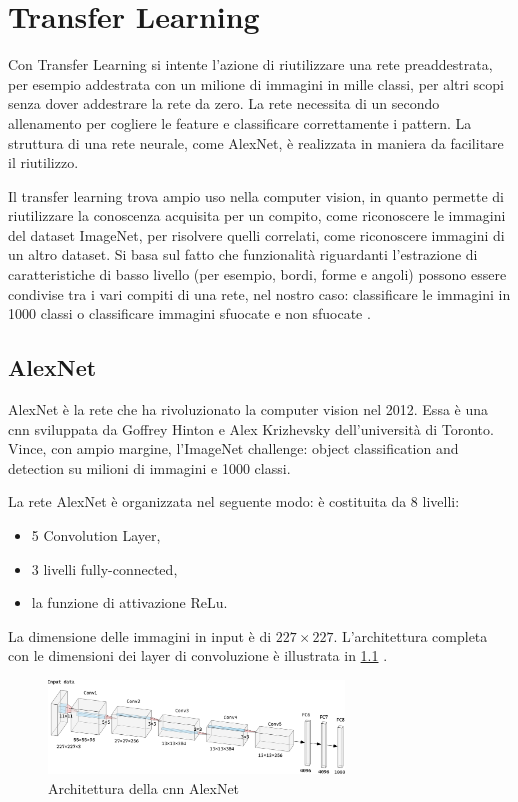 \chapter{Transfer Learning}\label{transfer-learning}

Con Transfer Learning si intente l'azione di riutilizzare una rete preaddestrata, per esempio addestrata con un milione di immagini in mille classi, per altri scopi senza dover addestrare la rete da zero. La rete necessita di un secondo allenamento per cogliere le feature e classificare correttamente i pattern. La struttura di una rete neurale, come AlexNet, è realizzata in maniera da facilitare il riutilizzo. 

Il transfer learning trova ampio uso nella computer vision, in quanto permette di riutilizzare la conoscenza acquisita per un
compito, come riconoscere le immagini del dataset ImageNet, per risolvere quelli correlati, come riconoscere immagini di un altro dataset. Si basa sul fatto che
funzionalità riguardanti l'estrazione di caratteristiche di basso livello
(per esempio, bordi, forme e angoli) possono essere condivise tra i vari compiti di una rete, nel nostro caso: classificare le immagini in 1000 classi o classificare immagini sfuocate e non sfuocate \cite{patrini_tl}.

\section{AlexNet}\label{alexnet}
AlexNet è la rete che ha rivoluzionato la computer vision nel 2012. Essa è una \gls{cnn} sviluppata
da Goffrey Hinton e Alex Krizhevsky dell’università di Toronto. Vince, con ampio margine, 
l’ImageNet challenge: object classification and detection su milioni di immagini e 1000 classi.

La rete AlexNet è organizzata nel seguente modo: è costituita da 8 livelli:
\begin{itemize}
    \item 5 \gls{Convolution Layer},
    \item 3 livelli \gls{fully-connected},
    \item la funzione di attivazione \gls{ReLu}.
\end{itemize}
La dimensione delle immagini in input è di \(227\times 227\). L'architettura completa con le dimensioni dei layer di \gls{convoluzione} è illustrata in \cref{fig:alexnet} \cite{alexnet}.  

\begin{figure}[ht]
    \centering
    \includegraphics[width=0.7\textwidth]{addestramento-rete-neurale/alexnet.pdf}
    \caption{Architettura della \gls{cnn} AlexNet}
    \label{fig:alexnet}
\end{figure}

